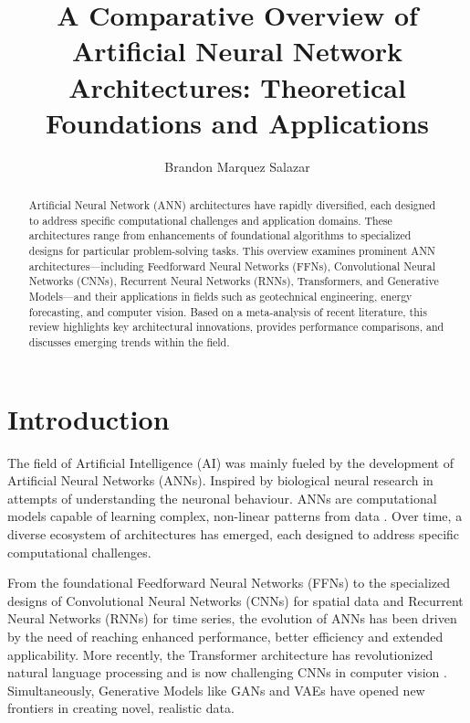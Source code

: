 \documentclass[10pt, conference]{IEEEtran}
\title{A Comparative Overview of Artificial Neural Network Architectures:
Theoretical Foundations and Applications}
\author{Brandon Marquez Salazar}
\begin{document}
\maketitle

\begin{abstract}

  Artificial Neural Network (ANN) architectures have rapidly diversified,
  each designed to address specific computational challenges and
  application domains. These architectures range from enhancements of
  foundational algorithms to specialized designs for particular
  problem-solving tasks. This overview examines prominent ANN
  architectures---including Feedforward Neural Networks (FFNs),
  Convolutional Neural Networks (CNNs), Recurrent Neural Networks (RNNs),
  Transformers, and Generative Models---and their applications in fields
  such as geotechnical engineering, energy forecasting, and computer
  vision. Based on a meta-analysis of recent literature, this review
  highlights key architectural innovations, provides performance
  comparisons, and discusses emerging trends within the field.

\end{abstract}

\section{Introduction}
\label{sec:introduction}

 The field of Artificial Intelligence (AI) was mainly fueled
 by the development of Artificial Neural Networks (ANNs). Inspired by
 biological neural research in attempts of understanding the neuronal
 behaviour. ANNs are computational models capable of
 learning complex, non-linear patterns from data \cite{lecun2015deep}.
 Over time, a diverse ecosystem of architectures has emerged, each
 designed to address specific computational challenges.

 From the foundational Feedforward Neural Networks (FFNs)
 \cite{rumelhart1986learning} to the specialized designs of Convolutional
 Neural Networks (CNNs) \cite{he2016deep} for spatial data and Recurrent
 Neural Networks (RNNs) \cite{hochreiter1997long} for time series, the
 evolution of ANNs has been driven by the need of reaching enhanced performance,
 better efficiency and extended applicability. More recently, the Transformer
 architecture \cite{vaswani2017attention} has revolutionized natural
 language processing and is now challenging CNNs in computer vision
 \cite{dosovitskiy2020image}. Simultaneously, Generative Models like GANs
 \cite{goodfellow2014generative} and VAEs \cite{kingma2013auto} have
 opened new frontiers in creating novel, realistic data.
\end{document}
